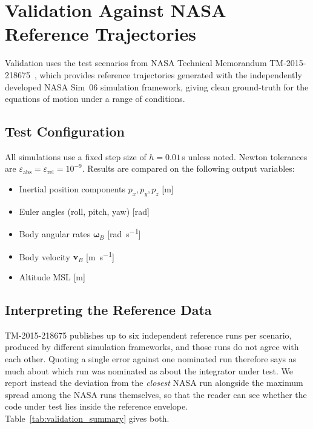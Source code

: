 \documentclass[a4paper,10pt]{article}
\newcommand{\omB}{\boldsymbol{\omega}_B}
\newcommand{\vB}{\mathbf{v}_B}
\theoremstyle{definition}
\begin{document}
\section{Validation Against NASA Reference Trajectories}
\label{sec:validation}

Validation uses the test scenarios from NASA Technical Memorandum
TM-2015-218675~\cite{NASA_TM_2015_218675}, which provides reference
trajectories generated with the independently developed NASA Sim~06 simulation
framework, giving clean ground-truth for the equations of motion under a range
of conditions.

\subsection{Test Configuration}

All simulations use a fixed step size of $h = 0.01\,$s unless noted.  Newton
tolerances are $\varepsilon_{\mathrm{abs}} = \varepsilon_{\mathrm{rel}} = 10^{-9}$.
Results are compared on the following output variables:

\begin{itemize}
  \item Inertial position components $p_x, p_y, p_z$ [\si{\metre}]
  \item Euler angles (roll, pitch, yaw) [\si{\radian}]
  \item Body angular rates $\omB$ [\si{\radian\per\second}]
  \item Body velocity $\vB$ [\si{\metre\per\second}]
  \item Altitude MSL [\si{\metre}]
\end{itemize}

\subsection{Interpreting the Reference Data}
\label{sec:ref_spread}

TM-2015-218675 publishes up to six independent reference runs per scenario,
produced by different simulation frameworks, and those runs do not agree with
each other.  Quoting a single error against one nominated run therefore says
as much about which run was nominated as about the integrator under test.  We
report instead the deviation from the \emph{closest} NASA run alongside the
maximum spread among the NASA runs themselves, so that the reader can see
whether the code under test lies inside the reference envelope.
Table~\ref{tab:validation_summary} gives both.
\end{document}
